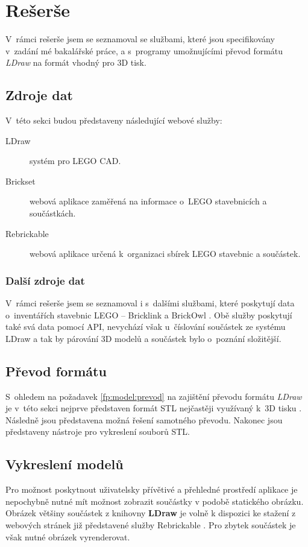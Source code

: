 \chapter{Rešerše}
V~rámci rešerše jsem se seznamoval se službami, které jsou specifikovány v~zadání mé bakalářské práce, a s~programy umožnujícími převod formátu \textit{LDraw} na formát vhodný pro 3D tisk.

\section{Zdroje dat}  

V~této sekci budou představeny následující webové služby:
\begin{description}
  \item[LDraw] systém pro LEGO \gls{CAD}.
  \item[Brickset] webová aplikace zaměřená na informace o~LEGO stavebnicích a součástkách.
  \item[Rebrickable] webová aplikace určená k~organizaci sbírek LEGO stavebnic a součástek.
\end{description}




\subsection{Další zdroje dat}
V~rámci rešerše jsem se seznamoval i s~dalšími službami, které poskytují data o~inventářích stavebnic LEGO – Bricklink \autocite{bricklink} a BrickOwl \autocite{brickowl}. Obě služby poskytují také svá data pomocí \gls{API}, nevychází však u~číslování součástek ze systému LDraw a tak by párování 3D modelů a součástek bylo o~poznání složitější. 

\section{Převod formátu}
S~ohledem na požadavek \ref{fp:model:prevod} na zajištění převodu formátu \textit{LDraw} je v~této sekci nejprve představen formát \gls{STL} nejčastěji využívaný k~3D tisku \autocite{3DAddFab}. Následně jsou představena možná řešení samotného převodu. Nakonec jsou představeny nástroje pro vykreslení souborů STL.






\section{Vykreslení modelů}
Pro možnost poskytnout uživatelsky přívětivé a přehledné prostředí aplikace je nepochybně nutné mít možnost zobrazit součástky v podobě statického obrázku. Obrázek většiny součástek z knihovny \textbf{LDraw} je volně k dispozici ke stažení z webových stránek již představené služby Rebrickable \autocite{rebrickable:download}. Pro zbytek součástek je však nutné obrázek vyrenderovat. 

